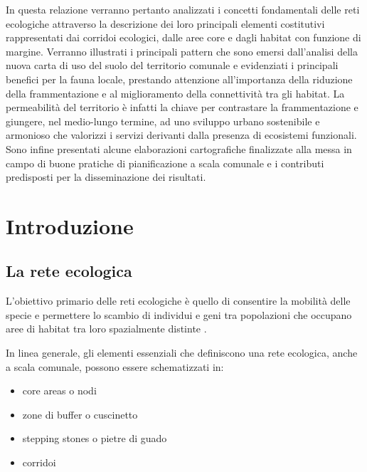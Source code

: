 \documentclass[
  a4paper,
]{book}
\providecommand{\tightlist}{%
  \setlength{\itemsep}{0pt}\setlength{\parskip}{0pt}}
\begin{document}
In questa relazione verranno pertanto analizzati i concetti fondamentali delle reti ecologiche attraverso la descrizione dei loro principali elementi costitutivi rappresentati dai corridoi ecologici, dalle aree core e dagli habitat con funzione di margine. Verranno illustrati i principali pattern che sono emersi dall'analisi della nuova carta di uso del suolo del territorio comunale e evidenziati i principali benefici per la fauna locale, prestando attenzione all'importanza della riduzione della frammentazione e al miglioramento della connettività tra gli habitat. La permeabilità del territorio è infatti la chiave per contrastare la frammentazione e giungere, nel medio-lungo termine, ad uno sviluppo urbano sostenibile e armonioso che valorizzi i servizi derivanti dalla presenza di ecosistemi funzionali. Sono infine presentati alcune elaborazioni cartografiche finalizzate alla messa in campo di buone pratiche di pianificazione a scala comunale e i contributi predisposti per la disseminazione dei risultati.

\chapter{Introduzione}\label{introduzione}

\section{La rete ecologica}\label{la-rete-ecologica}

L'obiettivo primario delle reti ecologiche è quello di consentire la
mobilità delle specie e permettere lo scambio di individui e geni tra
popolazioni che occupano aree di habitat tra loro spazialmente distinte
\citep{battistiFrammentazioneAmbientaleConnettivita2004}.

In linea generale, gli elementi essenziali che definiscono una rete
ecologica, anche a scala comunale, possono essere schematizzati in:

\begin{itemize}
\tightlist
\item
  core areas o nodi
\item
  zone di buffer o cuscinetto
\item
  stepping stones o pietre di guado
\item
  corridoi
\end{itemize}
\end{document}
